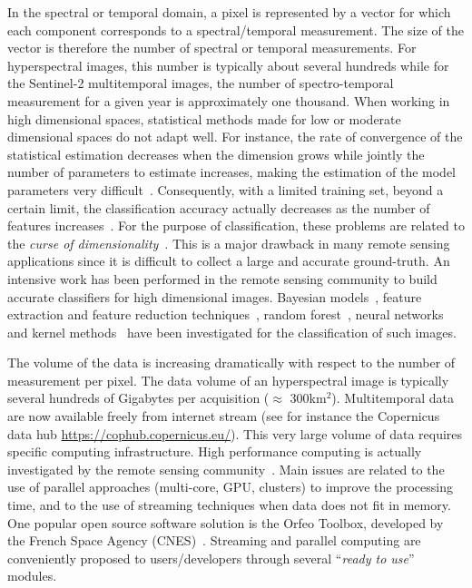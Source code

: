\documentclass[journal,10pt]{IEEEtran}
\begin{document}
In the spectral or temporal domain, a pixel is represented by a vector
for   which  each   component  corresponds   to  a   spectral/temporal
measurement.   The size  of  the  vector is  therefore  the number  of
spectral  or temporal  measurements.  For  hyperspectral images,  this
number is  typically about several  hundreds while for  the Sentinel-2
multitemporal images, the number of spectro-temporal measurement for a
given  year  is approximately  one  thousand.   When working  in  high
dimensional  spaces,  statistical  methods  made for  low  or  moderate
dimensional  spaces do  not  adapt  well.  For  instance,  the rate  of
convergence of the statistical estimation decreases when the dimension
grows while jointly the number of parameters to estimate increases,
making    the    estimation    of   the    model    parameters    very
difficult~\cite{donoho}.  Consequently,  with a limited  training set,
beyond a certain limit, the classification accuracy actually decreases
as the number of features increases~\cite{hughes}.  For the purpose of
classification,  these  problems are  related  to  the \emph{curse  of
  dimensionality}~\cite{donoho}.  This is  a  major  drawback in  many
remote sensing  applications since it  is difficult to collect  a large
and accurate ground-truth.  An intensive work has been performed in
the remote  sensing community to  build accurate classifiers  for high
dimensional  images.   Bayesian models~\cite{book:landgrebe},  feature
extraction              and             feature              reduction
techniques~\cite{book:landgrebe,DR:guided:tour},                random
forest~\cite{1396322},   neural  networks~\cite{5411821}   and  kernel
methods~\cite{kernel:methods:rs}  have   been  investigated   for  the
classification of such images.

The volume of the data is  increasing dramatically with respect to the
number of measurement  per pixel. The data volume  of an hyperspectral
image  is  typically several  hundreds  of  Gigabytes per  acquisition
($\approx$  300km$^2$). Multitemporal  data are  now available  freely
from  internet  stream  (see  for instance  the  Copernicus  data  hub
\url{https://cophub.copernicus.eu/}).  This very  large volume of data
requires   specific   computing  infrastructure.    High   performance
computing   is   actually   investigated   by   the   remote   sensing
community~\cite{christophe2011remote,plaza2011high}.  Main  issues are
related to the use of parallel approaches (multi-core, GPU, clusters) to
improve the  processing time, and  to the use of  streaming techniques
when data  does not fit in  memory.  One popular open  source software
solution  is  the Orfeo  Toolbox,  developed  by the  French  Space
Agency (CNES)~\cite{christophe2008orfeo}.   Streaming and  parallel computing
are  conveniently proposed  to  users/developers through  several ``\emph{ready to use}'' modules.
\end{document}
